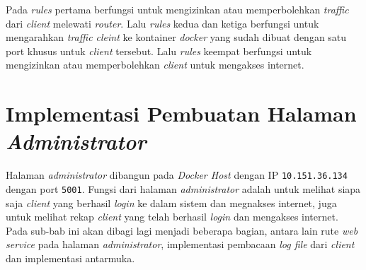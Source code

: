 Pada \textit{rules} pertama berfungsi untuk mengizinkan atau memperbolehkan \textit{traffic} dari \textit{client} melewati \textit{router}. Lalu \textit{rules} kedua dan ketiga berfungsi untuk mengarahkan \textit{traffic cleint} ke kontainer \textit{docker} yang sudah dibuat dengan satu port khusus untuk \textit{client} tersebut. Lalu \textit{rules} keempat berfungsi untuk mengizinkan atau memperbolehkan \textit{client} untuk mengakses internet.

\section{Implementasi Pembuatan Halaman \textit{Administrator}}
Halaman \textit{administrator} dibangun pada \textit{Docker Host} dengan IP \texttt{10.151.36.134} dengan port \texttt{5001}. Fungsi dari halaman \textit{administrator} adalah untuk melihat siapa saja \textit{client} yang berhasil \textit{login} ke dalam sistem dan megnakses internet, juga untuk melihat rekap \textit{client} yang telah berhasil \textit{login} dan mengakses internet. Pada sub-bab ini akan dibagi lagi menjadi beberapa bagian, antara lain rute \textit{web service} pada halaman \textit{administrator}, implementasi pembacaan \textit{log file} dari \textit{client} dan implementasi antarmuka.

